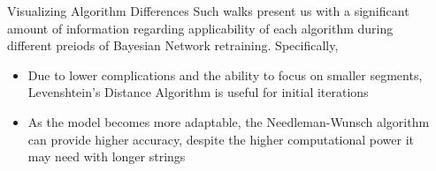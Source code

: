 \documentclass[final]{beamer}
\newlength{\sepwidth}
\newlength{\colwidth}
\newcommand{\separatorcolumn}{\begin{column}{\sepwidth}\end{column}}
\begin{document}
\begin{frame}[t]
\begin{columns}[t]
\begin{column}{\colwidth}
\begin{block}{Visualizing Algorithm Differences}
    Such walks present us with a significant amount of information regarding applicability of each algorithm during different preiods of Bayesian Network retraining. Specifically,
    \begin{itemize}
        \item Due to lower complications and the ability to focus on smaller segments, Levenshtein's Distance Algorithm is useful for initial iterations
        \item As the model becomes more adaptable, the Needleman-Wunsch algorithm can provide higher accuracy, despite the higher computational power it may need with longer strings
    \end{itemize}

  \end{block}
\end{column}

\separatorcolumn
\end{columns}
\end{frame}
\end{document}
